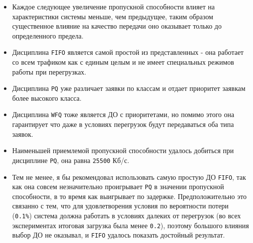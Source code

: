 \documentclass[12pt, a4paper]{article}
\begin{document}
\begin{itemize}
  \item Каждое следующее увеличение пропускной способности влияет на характеристики
    системы меньше, чем предыдущее, таким образом существенное влияние на качество
    передачи оно оказывает только до определенного предела.
  \item Дисциплина \texttt{FIFO} является самой простой из
    представленных - она работает со всем трафиком как с единым целым и не имеет
    специальных режимов работы при перегрузках.
  \item Дисциплина \texttt{PQ} уже различает заявки по классам и отдает приоритет
    заявкам более высокого класса.
  \item Дисциплина \texttt{WFQ} тоже является ДО с приоритетами, но помимо этого
    она гарантирует что даже в условиях перегрузок будут передаваться оба типа
    заявок.
  \item Наименьшей приемлемой пропускной способности удалось добиться при дисциплине
    \texttt{PQ}, она равна \texttt{25500} Кб/с.
  \item Тем не менее, я бы рекомендовал использовать самую простую ДО \texttt{FIFO},
    так как она совсем незначительно проигрывает \texttt{PQ} в значении пропускной
    способности, в то время как выигрывает по задержке. Предположительно это связанно
    с тем, что для удовлетворения условия по вероятности потери (\texttt{0.1\%})
    система должна работать в условиях далеких от перегрузок (во всех экспериментах
    итоговая загрузка была менее \texttt{0.2}), поэтому большого влияния выбор ДО
    не оказывал, и \texttt{FIFO} удалось показать достойный результат.
\end{itemize}
\end{document}
